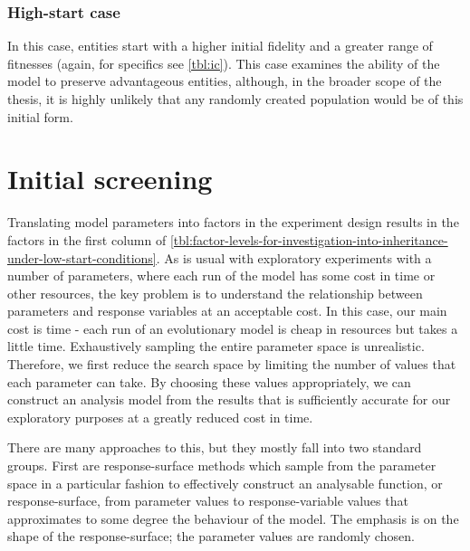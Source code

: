 \subsection{High-start case}\label{high-start-case}

In this case, entities start with a higher initial fidelity and a greater range of fitnesses (again, for specifics see \cref{tbl:ic}). This case examines the ability of the model to preserve advantageous entities, although, in the broader scope of the thesis, it is highly unlikely that any randomly created population would be of this initial form.


\chapter{Initial screening}

Translating model parameters into factors in the experiment design results in the factors in the first column of \ref{tbl:factor-levels-for-investigation-into-inheritance-under-low-start-conditions}. As is usual with exploratory experiments with a number of parameters, where each run of the model has some cost in time or other resources, the key problem is to understand the relationship between parameters and response variables at an acceptable cost. In this case, our main cost is time - each run of an evolutionary model is cheap in resources but takes a little time. Exhaustively sampling the entire parameter space is unrealistic. Therefore, we first reduce the search space by limiting the number of values that each parameter can take. By choosing these values appropriately, we can construct an analysis model from the results that is sufficiently accurate for our exploratory purposes at a greatly reduced cost in time.

There are many approaches to this, but they mostly fall into two standard groups. First are response-surface methods which sample from the parameter space in a particular fashion to effectively construct an analysable function, or response-surface, from parameter values to response-variable values that approximates to some degree the behaviour of the model. The emphasis is on the shape of the response-surface; the parameter values are randomly chosen.

